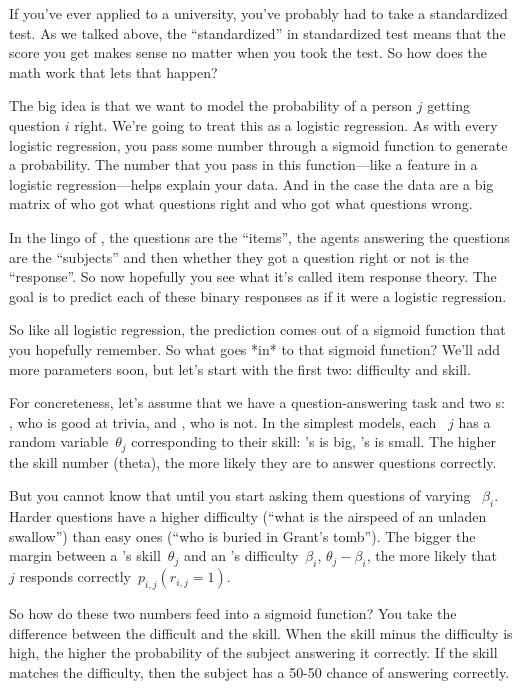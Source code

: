 If you’ve ever applied to a university, you’ve probably had to take a
standardized test.  As we talked above, the ``standardized'' in standardized
test means that the score you get makes sense no matter when you took the
test.  So how does the math work that lets that happen?

The big idea is that we want to model the probability of a person $j$ getting
question $i$ right.  We’re going to treat this as a logistic regression.  As
with every logistic regression, you pass some number through a sigmoid
function to generate a probability.  The number that you pass in this
function—like a feature in a logistic regression—helps explain your data. And
in the case the data are a big matrix of who got what questions right and who
got what questions wrong.

In the lingo of , the questions are the ``items'', the agents answering
the questions are the ``subjects'' and then whether they got a question right or
not is the ``response''.  So now hopefully you see what it’s called item
response theory.  The goal is to predict each of these binary responses as if
it were a logistic regression.

So like all logistic regression, the prediction comes out of a sigmoid
function that you hopefully remember.  So what goes *in* to that sigmoid
function?  We’ll add more parameters soon, but let’s start with the first two:
difficulty and skill.

For concreteness, let's assume that we have a question-answering task and two \subj{}s: \smart{},
who is good at trivia, and \dumb{}, who is not.
In the simplest \irt{} models, each \subj{}~$j$ has a random
variable~$\theta_j$ corresponding to their skill: \smart{}'s is big,
\dumb{}'s is small.  The higher the skill number
(theta), the more likely they are to answer questions correctly.

But you cannot know that until you start asking them questions of
varying ~$\beta_i$.
Harder questions have a higher difficulty (``what is the airspeed of
an unladen swallow'') than easy ones (``who is buried in Grant's
tomb'').
The bigger the margin between a \subj{}'s skill~$\theta_j$ and an \itm{}'s
difficulty~$\beta_i$, $\theta_j-\beta_i$, the more likely that \subj{}~$j$
responds correctly~$p_{i,j}(r_{i,j}=1)$.


So how do these two numbers feed into a sigmoid function?  You take the
difference between the difficult and the skill.  When the skill minus the
difficulty is high, the higher the probability of the subject answering it
correctly.  If the skill matches the difficulty, then the subject has a 50-50
chance of answering correctly.

